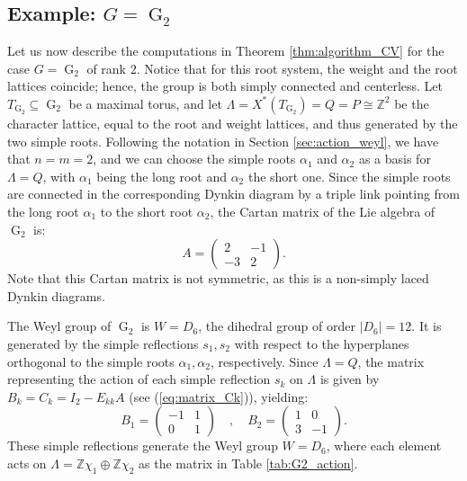 \documentclass[11pt,english]{amsart}
\numberwithin{equation}{section}
\numberwithin{figure}{section}
\theoremstyle{plain}
\theoremstyle{plain}
\theoremstyle{definition}
\theoremstyle{remark}
\newcommand{\G}{\operatorname{G}}
\begin{document}
\subsection{Example: $G = \G_2$}\label{ssec:G2}
Let us now describe the computations in Theorem \ref{thm:algorithm_CV} for 
the case $G=\G_2$ of rank $2$. Notice that for this root system, the weight and 
the root lattices coincide; hence, the group is both simply connected and centerless. 
Let $T_{\G_2} \subseteq \G_2$ be a maximal torus, and let $\Lambda = X^*(T_{\G_2}) = Q = P \cong \mathbb{Z}^2$ 
be the character lattice, equal to the root and weight lattices, and thus generated 
by the two simple roots. Following the notation in Section \ref{sec:action_weyl}, 
we have that $n = m = 2$, and we can choose the simple roots $\alpha_1$ and 
$\alpha_2$ as a basis for $\Lambda = Q$, with $\alpha_1$ being the long root 
and $\alpha_2$ the short one. Since the simple roots are connected in the corresponding Dynkin diagram by a triple 
link pointing from the long root $\alpha_1$ to the short root $\alpha_2$, the Cartan 
matrix of the Lie algebra of $\G_2$ is:
\[
A = \begin{pmatrix} 2 & -1 \\ -3 & 2 \end{pmatrix}.
\]
Note that this Cartan matrix is not symmetric, as this is a non-simply laced Dynkin diagrams.

The Weyl group of $\G_2$ is $W = D_6$, the dihedral group of order $|D_6|=12$. It is 
generated by the simple reflections $s_1, s_2$ with respect to the hyperplanes 
orthogonal to the simple roots $\alpha_1, \alpha_2$, respectively. Since $\Lambda = Q$, 
the matrix representing the action of each simple reflection $s_k$ on $\Lambda$ is 
given by $B_k = C_k = I_2 - E_{kk}A$ (see (\ref{eq:matrix_Ck})), yielding: 
\[
B_1 = \begin{pmatrix} -1 & 1 \\ 0 & 1 \end{pmatrix}\quad , \quad 
B_2 = \begin{pmatrix} 1 & 0 \\ 3 & -1 \end{pmatrix}.
\]
These simple reflections generate the Weyl group $W=D_6$, where each element acts on $\Lambda=\mathbb{Z}\chi_1\oplus \mathbb{Z}\chi_2$ as the matrix in Table \ref{tab:G2_action}.
\end{document}

